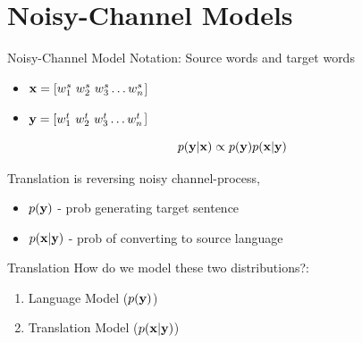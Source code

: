 \documentclass{beamer}
\begin{document}
  


\section{Noisy-Channel Models}

\begin{frame}{Noisy-Channel Model}
  Notation: Source words and target words
  \begin{itemize}
  \item $\mathbf{x}  = [ w^s_1\ w^s_2\ w^s_3\ldots w^s_n $] 
  \item $\mathbf{y} =  [w^t_1\ w^t_2\ w^t_3\ldots w^t_n $] 
  \end{itemize}

  \[ p(\mathbf{y} | \mathbf{x}) \propto p(\mathbf{y}) p(\mathbf{x} | \mathbf{y}) \] 


  Translation is reversing noisy channel-process,
  \begin{itemize}
  \item $p(\mathbf{y})$ - prob generating target sentence
  \item $p(\mathbf{x} | \mathbf{y})$ - prob of converting to source language
  \end{itemize}
\end{frame}

\begin{frame}{Translation}
  How do we model these two distributions?:
  \air
  
  \begin{enumerate}
  \item Language Model ($p(\mathbf{y})$) 
    \air 

  \item Translation Model ($p(\mathbf{x} | \mathbf{y})$) 
  \end{enumerate}
\end{frame}
\end{document}

